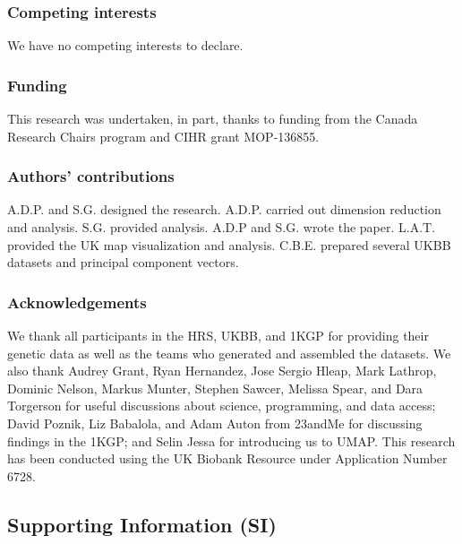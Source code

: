 \documentclass[12pt]{pnas-new}
\newcommand{\beginsupplement}{%
        \setcounter{table}{0}
        \renewcommand{\thetable}{S\arabic{table}}%
        \setcounter{figure}{0}
        \renewcommand{\thefigure}{S\arabic{figure}}%
     }
\begin{document}
\subsubsection*{Competing interests}
We have no competing interests to declare.

\subsubsection*{Funding}
This research was undertaken, in part, thanks to funding from the Canada Research Chairs program and CIHR grant MOP-136855.

\subsubsection*{Authors' contributions}
A.D.P. and S.G. designed the research. A.D.P. carried out dimension reduction and analysis. S.G. provided analysis. A.D.P and S.G. wrote the paper. L.A.T. provided the UK map visualization and analysis. C.B.E. prepared several UKBB datasets and principal component vectors.

\subsubsection*{Acknowledgements}
We thank all participants in the HRS, UKBB, and 1KGP for providing their genetic data as well as the teams who generated and assembled the datasets. We also thank Audrey Grant, Ryan Hernandez, Jose Sergio Hleap, Mark Lathrop, Dominic Nelson, Markus Munter, Stephen Sawcer, Melissa Spear, and Dara Torgerson for useful discussions about science, programming, and data access; David Poznik, Liz Babalola, and Adam Auton from 23andMe for discussing findings in the 1KGP; and Selin Jessa for introducing us to UMAP. This research has been conducted using the UK Biobank Resource under Application Number 6728.



\newpage

\beginsupplement
\subsection*{Supporting Information (SI)}
\end{document}
